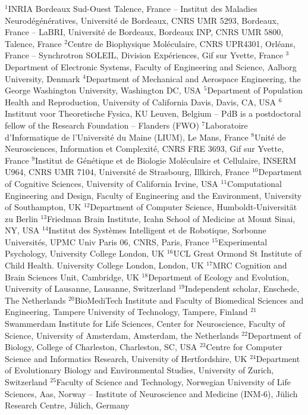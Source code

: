 $^{1}$INRIA Bordeaux Sud-Ouest Talence, France – Institut des Maladies Neurodégénératives, Université de Bordeaux, CNRS UMR 5293, Bordeaux, France – LaBRI, Université de Bordeaux, Bordeaux INP, CNRS UMR 5800, Talence, France
$^{2}$Centre de Biophysique Moléculaire, CNRS UPR4301, Orléans, France -- Synchrotron SOLEIL, Division Expériences, Gif sur Yvette, France
$^{3}$Department of Electronic Systems, Faculty of Engineering and Science, Aalborg University, Denmark
$^{4}$Department of Mechanical and Aerospace Engineering, the George Washington University, Washington DC, USA
$^{5}$Department of Population Health and Reproduction, University of California Davis, Davis, CA, USA
$^{6}$Instituut voor Theoretische Fysica, KU Leuven, Belgium -- PdB is a postdoctoral fellow of the Research Foundation -- Flanders (FWO)
$^{7}$Laboratoire d'Informatique de l'Université du Maine (LIUM), Le Mans, France
$^{8}$Unité de Neurosciences, Information et Complexité, CNRS FRE 3693, Gif sur Yvette, France
$^{9}$Institut de Génétique et de Biologie Moléculaire et Cellulaire, INSERM U964, CNRS UMR 7104, Université de Strasbourg, Illkirch, France
$^{10}$Department of Cognitive Sciences, University of California Irvine, USA
$^{11}$Computational Engineering and Design, Faculty of Engineering and the Environment, University of Southampton, UK
$^{12}$Department of Computer Science, Humboldt-Universität zu Berlin
$^{13}$Friedman Brain Institute, Icahn School of Medicine at Mount Sinai, NY, USA
$^{14}$Institut des Systèmes Intelligent et de Robotique, Sorbonne Universités, UPMC Univ Paris 06, CNRS, Paris, France
$^{15}$Experimental Psychology, University College London, UK
$^{16}$UCL Great Ormond St Institute of Child Health. University College London, London, UK
$^{17}$MRC Cognition and Brain Sciences Unit, Cambridge, UK
$^{18}$Department of Ecology and Evolution, University of Lausanne, Lausanne, Switzerland
$^{19}$Independent scholar, Enschede, The Netherlands
$^{20}$BioMediTech Institute and Faculty of Biomedical Sciences and Engineering, Tampere University of Technology, Tampere, Finland
$^{21}$Swammerdam Institute for Life Sciences, Center for Neuroscience, Faculty of Science, University of Amsterdam, Amsterdam, the Netherlands
$^{22}$Department of Biology, College of Charleston, Charleston, SC, USA
$^{23}$Centre for Computer Science and Informatics Research, University of Hertfordshire, UK
$^{24}$Department of Evolutionary Biology and Environmental Studies, University of Zurich, Switzerland
$^{25}$Faculty of Science and Technology, Norwegian University of Life Sciences, Aas, Norway -- Institute of Neuroscience and Medicine (INM-6), Jülich Research Centre, Jülich, Germany
